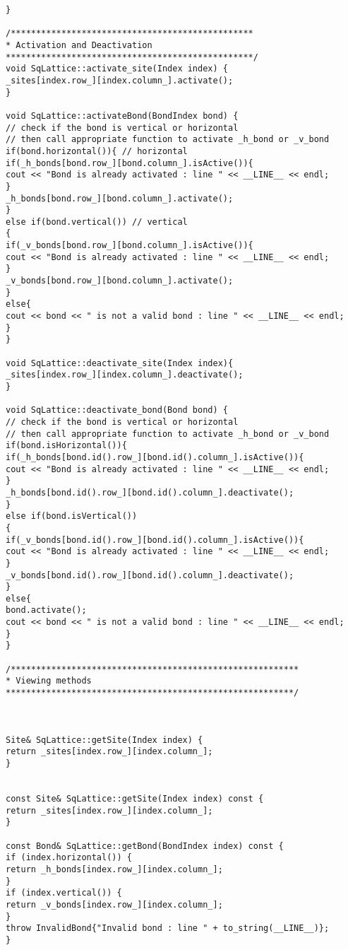\begin{lstlisting}[style=CStyle]
}

/************************************************
* Activation and Deactivation
*************************************************/
void SqLattice::activate_site(Index index) {
_sites[index.row_][index.column_].activate();
}

void SqLattice::activateBond(BondIndex bond) {
// check if the bond is vertical or horizontal
// then call appropriate function to activate _h_bond or _v_bond
if(bond.horizontal()){ // horizontal
if(_h_bonds[bond.row_][bond.column_].isActive()){
cout << "Bond is already activated : line " << __LINE__ << endl;
}
_h_bonds[bond.row_][bond.column_].activate();
}
else if(bond.vertical()) // vertical
{
if(_v_bonds[bond.row_][bond.column_].isActive()){
cout << "Bond is already activated : line " << __LINE__ << endl;
}
_v_bonds[bond.row_][bond.column_].activate();
}
else{
cout << bond << " is not a valid bond : line " << __LINE__ << endl;
}
}

void SqLattice::deactivate_site(Index index){
_sites[index.row_][index.column_].deactivate();
}

void SqLattice::deactivate_bond(Bond bond) {
// check if the bond is vertical or horizontal
// then call appropriate function to activate _h_bond or _v_bond
if(bond.isHorizontal()){
if(_h_bonds[bond.id().row_][bond.id().column_].isActive()){
cout << "Bond is already activated : line " << __LINE__ << endl;
}
_h_bonds[bond.id().row_][bond.id().column_].deactivate();
}
else if(bond.isVertical())
{
if(_v_bonds[bond.id().row_][bond.id().column_].isActive()){
cout << "Bond is already activated : line " << __LINE__ << endl;
}
_v_bonds[bond.id().row_][bond.id().column_].deactivate();
}
else{
bond.activate();
cout << bond << " is not a valid bond : line " << __LINE__ << endl;
}
}

/*********************************************************
* Viewing methods
*********************************************************/



Site& SqLattice::getSite(Index index) {
return _sites[index.row_][index.column_];
}


const Site& SqLattice::getSite(Index index) const {
return _sites[index.row_][index.column_];
}

const Bond& SqLattice::getBond(BondIndex index) const {
if (index.horizontal()) {
return _h_bonds[index.row_][index.column_];
}
if (index.vertical()) {
return _v_bonds[index.row_][index.column_];
}
throw InvalidBond{"Invalid bond : line " + to_string(__LINE__)};
}


\end{lstlisting}
